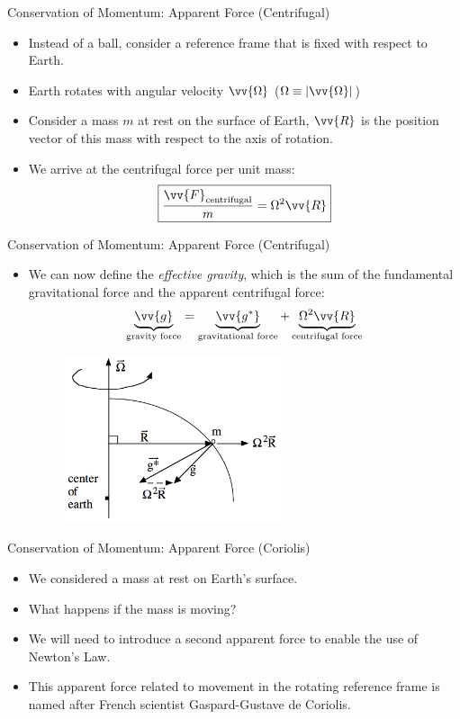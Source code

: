 \begin{frame}{Conservation of Momentum: Apparent Force (Centrifugal)}

\begin{itemize}
	\item Instead of a ball, consider a reference frame that is fixed with respect to Earth.
	\item Earth rotates with angular velocity $\vv{\Omega}$ ($\Omega \equiv \left| \vv{\Omega}\right|$)
	\item Consider a mass $m$ at rest on the surface of Earth, $\vv{R}$ is the position vector of this mass with respect to the axis of rotation.
	\item We arrive at the centrifugal force per unit mass:
	$$\boxed{\frac{\vv{F}_{\text{centrifugal}}}{m} = \Omega^2\vv{R}}$$
\end{itemize}
\end{frame}
\begin{frame}{Conservation of Momentum: Apparent Force (Centrifugal)}

\begin{itemize}
	\item We can now define the \textit{effective gravity}, which is the sum of the fundamental gravitational force and the apparent centrifugal force:
	$$\underbrace{\vv{g}}_{\text{gravity force}} = \underbrace{\vv{g^*}}_{\text{gravitational force}} + \underbrace{\Omega^2 \vv{R}}_{\text{centrifugal force}}$$
	\begin{figure}
		\includegraphics[width=0.6\textwidth]{centrifugal5.png}	
	\end{figure}
\end{itemize}
\end{frame}
\begin{frame}{Conservation of Momentum: Apparent Force (Coriolis)}

\begin{itemize}
	\item We considered a mass at rest on Earth's surface. 
	\item What happens if the mass is moving?
	\item We will need to introduce a second apparent force to enable the use of Newton's  Law.
	\item This apparent force related to movement in the rotating reference frame is named after French scientist Gaspard-Gustave de Coriolis.
\end{itemize}
\end{frame}
